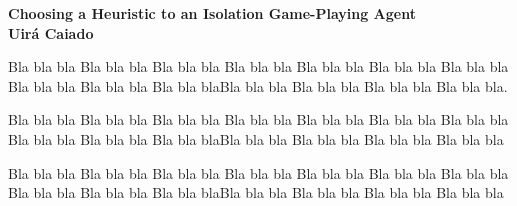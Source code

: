 \documentclass[a4paper]{article}
\begin{document}

\begin{center}

{\bf \large Choosing a Heuristic to an Isolation Game-Playing Agent \\ \small Uirá Caiado}
\end{center}


Bla bla bla Bla bla bla Bla bla bla Bla bla bla Bla bla bla Bla bla bla Bla bla bla Bla bla bla Bla bla bla Bla bla blaBla bla bla Bla bla bla Bla bla bla Bla bla bla.

Bla bla bla Bla bla bla Bla bla bla Bla bla bla Bla bla bla Bla bla bla Bla bla bla Bla bla bla Bla bla bla Bla bla blaBla bla bla Bla bla bla Bla bla bla Bla bla bla

Bla bla bla Bla bla bla Bla bla bla Bla bla bla Bla bla bla Bla bla bla Bla bla bla Bla bla bla Bla bla bla Bla bla blaBla bla bla Bla bla bla Bla bla bla Bla bla bla \cite{russelartificial}
































\end{document}
